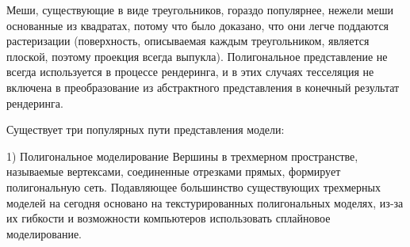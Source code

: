 Меши, существующие в виде треугольников, гораздо популярнее, нежели меши основанные из квадратах, 
потому что было доказано, что они легче поддаются растеризации (поверхность, описываемая каждым треугольником, является плоской, поэтому проекция всегда выпукла).
Полигональное представление не всегда используется в процессе рендеринга, и в этих случаях тесселяция не включена в преобразование из абстрактного представления в конечный результат рендеринга.

Существует три популярных пути представления модели:

1) Полигональное моделирование 
Вершины в трехмерном пространстве, называемые вертексами, соединенные отрезками прямых, формирует полигональную сеть.
Подавляющее большинство существующих трехмерных моделей на сегодня основано на текстурированных полигональных моделях, из-за их гибкости
и возможности компьютеров использовать сплайновое моделирование.

